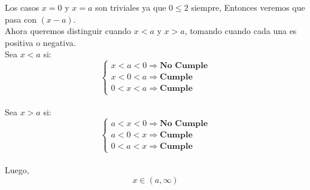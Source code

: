 \documentclass{article}
\begin{document}
Los casos $x = 0$ y $x = a$ son triviales ya que $0 \le 2$ siempre, Entonces veremos que pasa con $(x-a)$.\\

Ahora queremos distinguir cuando $x<a$ y $x>a$, tomando cuando cada una es positiva o negativa. \\

Sea $x<a$ si: 
	$$
\begin{cases}
	x < a < 0 \Rightarrow \textbf{No Cumple}\\
	x < 0 < a  \Rightarrow \textbf{Cumple} \\
	0 < x < a  \Rightarrow \textbf{Cumple}
\end{cases}
$$ \\

Sea $x>a$ si: 
$$
\begin{cases}
	a < x < 0 \Rightarrow \textbf{No Cumple}\\
	a < 0 < x  \Rightarrow \textbf{Cumple}\\
	0 < a < x  \Rightarrow \textbf{Cumple}
\end{cases}
$$ \\

Luego, 
		$$
	\boxed{ x\in(a,\infty)}
	$$
	
\end{document}
